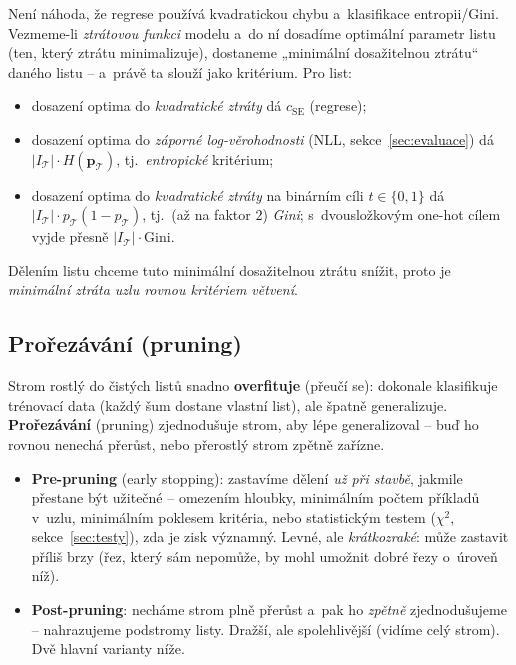 \begin{intuice}
Není náhoda, že regrese používá kvadratickou chybu a~klasifikace entropii/Gini. Vezmeme-li \emph{ztrátovou funkci} modelu a~do ní dosadíme optimální parametr listu (ten, který ztrátu minimalizuje), dostaneme „minimální dosažitelnou ztrátu`` daného listu -- a~právě ta slouží jako kritérium. Pro list:
\begin{itemize}
  \item dosazení optima do \emph{kvadratické ztráty} dá $c_{\mathrm{SE}}$ (regrese);
  \item dosazení optima do \emph{záporné log-věrohodnosti} (NLL, sekce~\ref{sec:evaluace}) dá $|I_{\mathcal{T}}|\cdot H(\mathbf{p}_{\mathcal{T}})$, tj.\ \emph{entropické} kritérium;
  \item dosazení optima do \emph{kvadratické ztráty} na binárním cíli $t\in\{0,1\}$ dá $|I_{\mathcal{T}}|\cdot p_{\mathcal{T}}(1-p_{\mathcal{T}})$, tj.\ (až na faktor $2$) \emph{Gini}; s~dvousložkovým one-hot cílem vyjde přesně $|I_{\mathcal{T}}|\cdot\mathrm{Gini}$.
\end{itemize}
Dělením listu chceme tuto minimální dosažitelnou ztrátu snížit, proto je \emph{minimální ztráta uzlu rovnou kritériem větvení}.
\end{intuice}

\subsection{Prořezávání (pruning)}

Strom rostlý do čistých listů snadno \textbf{overfituje} (přeučí se): dokonale klasifikuje trénovací data (každý šum dostane vlastní list), ale špatně generalizuje. \textbf{Prořezávání} (pruning) zjednodušuje strom, aby lépe generalizoval -- buď ho rovnou nenechá přerůst, nebo přerostlý strom zpětně zařízne.

\begin{definice}
\begin{itemize}
  \item \textbf{Pre-pruning} (early stopping): zastavíme dělení \emph{už při stavbě}, jakmile přestane být užitečné -- omezením hloubky, minimálním počtem příkladů v~uzlu, minimálním poklesem kritéria, nebo statistickým testem ($\chi^2$, sekce~\ref{sec:testy}), zda je zisk významný. Levné, ale \emph{krátkozraké}: může zastavit příliš brzy (řez, který sám nepomůže, by mohl umožnit dobré řezy o~úroveň níž).
  \item \textbf{Post-pruning}: necháme strom plně přerůst a~pak ho \emph{zpětně} zjednodušujeme -- nahrazujeme podstromy listy. Dražší, ale spolehlivější (vidíme celý strom). Dvě hlavní varianty níže.
\end{itemize}
\end{definice}

